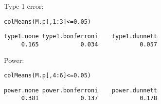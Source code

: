 \documentclass{article}
\begin{document}
Type 1 error:
\lstset{language=r,label= ,caption= ,captionpos=b,numbers=none}
\begin{lstlisting}
colMeans(M.p[,1:3]<=0.05)
\end{lstlisting}

\begin{verbatim}
type1.none type1.bonferroni    type1.dunnett 
     0.165            0.034            0.057
\end{verbatim}

Power:
\lstset{language=r,label= ,caption= ,captionpos=b,numbers=none}
\begin{lstlisting}
colMeans(M.p[,4:6]<=0.05)
\end{lstlisting}

\begin{verbatim}
power.none power.bonferroni    power.dunnett 
     0.381            0.137            0.178
\end{verbatim}

\clearpage
\end{document}
